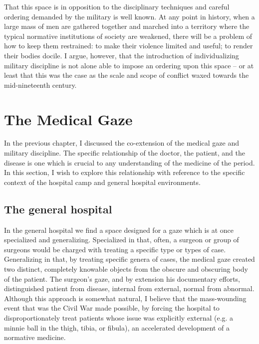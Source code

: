 \documentclass{report}
\begin{document}
  That this space is in opposition to the disciplinary techniques and careful ordering demanded by the military is well known. At any point
  in history, when a large mass of men are gathered together and marched into a territory where the typical normative institutions
  of society are weakened, there will be a problem of how to keep them restrained: to make their violence limited and useful; to render their
  bodies docile. I argue, however, that the introduction of individualizing military discipline is not alone able to impose an ordering upon
  this space -- or at least that this was the case as the scale and scope of conflict waxed towards the mid-nineteenth century.

  \chapter{The Medical Gaze}\label{chap: gaze} %

  In the previous chapter, I discussed the co-extension of the medical gaze and military discipline. The specific relationship of the doctor, the
  patient, and the disease is one which is crucial to any understanding of the medicine of the period. In this section, I wish to explore this relationship
  with reference to the specific context of the hospital camp and general hospital environments. 
  
  \section{The general hospital}\label{sec:general hospital} %
  In the general hospital we find a space designed for a gaze which is at once specialized and generalizing. Specialized in that, often, a surgeon
  or group of surgeons would be charged with treating a specific type or types of case. Generalizing in that, by treating specific genera of cases,
  the medical gaze created two distinct, completely knowable objects from the obscure and obscuring body of the patient. The surgeon's gaze, and by
  extension his documentary efforts, distinguished patient from disease, internal from external, normal from abnormal. Although this approach is somewhat
  natural, I believe that the mass-wounding event that was the Civil War made possible, by forcing the hospital to disproportionately treat patients whose issue was
  explicitly external (e.g. a minnie ball in the thigh, tibia, or fibula), an accelerated development of a normative medicine.


  \printbibliography
 
  
\end{document}
